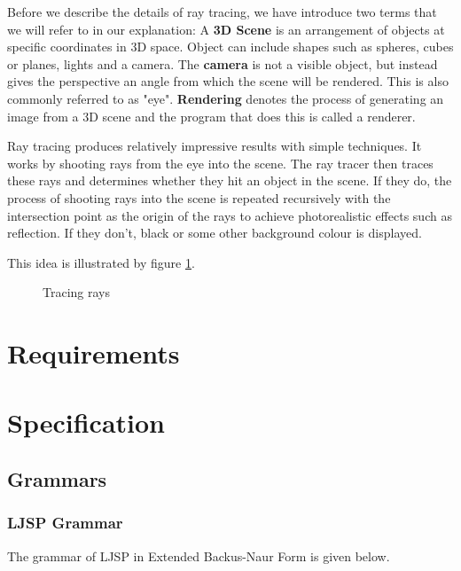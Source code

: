 \documentclass[11pt]{report}
\begin{document}
Before we describe the details of ray tracing, we have introduce two terms that we will refer to in our explanation: A \textbf{3D Scene} is an arrangement of objects at specific coordinates in 3D space. Object can include shapes such as spheres, cubes or planes, lights and a camera. The \textbf{camera} is not a visible object, but instead gives the perspective an angle from which the scene will be rendered. This is also commonly referred to as "eye". \textbf{Rendering} denotes the process of generating an image from a 3D scene and the program that does this is called a renderer.

Ray tracing produces relatively impressive results with simple techniques. It works by shooting rays from the eye into the scene. The ray tracer then traces these rays and determines whether they hit an object in the scene. If they do, the process of shooting rays into the scene is repeated recursively with the intersection point as the origin of the rays to achieve photorealistic effects such as reflection. If they don't, black or some other background colour is displayed.

This idea is illustrated by figure \ref{raytracingexplanation}.

\begin{figure}[ht]
\caption{Tracing rays}
\label{raytracingexplanation}
\end{figure}



\chapter{Requirements}

\chapter{Specification}
\section{Grammars}
\subsection{LJSP Grammar}
The grammar of LJSP in Extended Backus-Naur Form is given below.
\end{document}
